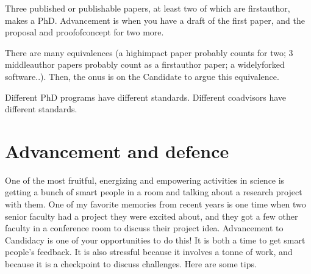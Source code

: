 \documentclass[letterpaper,10pt,english]{sphinxmanual}
\begin{document}
\sphinxAtStartPar
Three published or publishable papers, at least two of which are first\sphinxhyphen{}author, makes a PhD. Advancement is when you have a draft of the first paper, and the proposal and proof\sphinxhyphen{}of\sphinxhyphen{}concept for two more.

\sphinxAtStartPar
There are many equivalences (a high\sphinxhyphen{}impact paper probably counts for two; 3 middle\sphinxhyphen{}author papers probably count as a first\sphinxhyphen{}author paper; a widely\sphinxhyphen{}forked software..). Then, the onus is on the Candidate to argue this equivalence.

\sphinxAtStartPar
Different PhD programs have different standards.
Different co\sphinxhyphen{}advisors have different standards.


\section{Advancement and defence}
\label{\detokenize{04WhatIsAPhD:advancement-and-defence}}
\sphinxAtStartPar
One of the most fruitful, energizing and empowering activities in science is getting a bunch of smart people in a room and talking about a research project with them.
One of my favorite memories from recent years is one time when two senior faculty had a project they were excited about, and they got a few other faculty in a conference room to discuss their project idea.
Advancement to Candidacy is one of your opportunities to do this! It is both a time to get smart people’s feedback. It is also stressful because it involves a tonne of work, and because it is a checkpoint to discuss challenges. Here are some tips.
\end{document}
